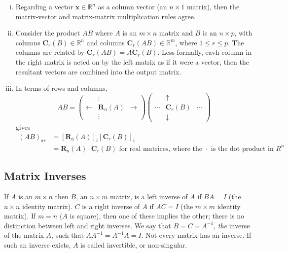 \documentclass{article}
\begin{document}
	\begin{enumerate}[(i)]
		\item Regarding a vector $\bm x \in \mathbb R^n$ as a column vector (an $n \times 1$ matrix), then the matrix-vector and matrix-matrix multiplication rules agree.
		\item Consider the product $AB$ where $A$ is an $m \times n$ matrix and $B$ is an $n \times p$, with columns $\bm C_r(B) \in \mathbb R^n$ and columns $\bm C_r(AB) \in \mathbb R^m$, where $1 \leq r \leq p$. The columns are related by $\bm C_r(AB) = A \bm C_r(B)$. Less formally, eavh column in the right matrix is acted on by the left matrix as if it were a vector, then the resultant vectors are combined into the output matrix.
		\item In terms of rows and columns,
		\[ AB = \begin{pmatrix}
			& \vdots & \\
			\leftarrow & \bm R_n(A) & \rightarrow \\
			& \vdots &
		\end{pmatrix} \begin{pmatrix}
			& \uparrow & \\
			\cdots & \bm C_r(B) & \cdots \\
			& \downarrow &
		\end{pmatrix} \]
		gives
		\begin{align*}
			(AB)_{ar} &= \left[ \bm R_a(A) \right]_i \left[ \bm C_r(B) \right]_i \\
			&= \bm R_a(A) \cdot \bm C_r(B) \text{ for real matrices, where the $\cdot$ is the dot product in $R^n$}
		\end{align*}
	\end{enumerate}

	\subsection{Matrix Inverses}
	If $A$ is an $m \times n$ then $B$, an $n \times m$ matrix, is a left inverse of $A$ if $BA = I$ (the $n \times n$ identity matrix). $C$ is a right inverse of $A$ if $AC = I$ (the $m \times m$ identity matrix). If $m = n$ ($A$ is square), then one of these implies the other; there is no distinction between left and right inverses. We say that $B = C = A^{-1}$, \textit{the} inverse of the matrix $A$, such that $AA^{-1} = A^{-1}A = I$. Not every matrix has an inverse. If such an inverse exists, $A$ is called invertible, or non-singular.
\end{document}
